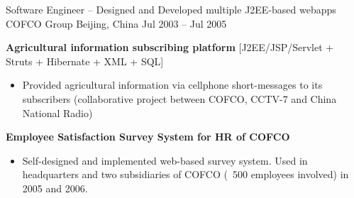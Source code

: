 \begin{cventries}
\cventry
{Software Engineer \tiny{-- Designed and Developed multiple J2EE-based webapps}}                   %
{COFCO Group}                         %
{Beijing, China}                      %
{Jul 2003 -- Jul 2005}                %
{
    \begin{cvitems}                          
    \item {
        \textbf{Agricultural information subscribing platform} 
        {\small{[J2EE/JSP/Servlet + Struts + Hibernate + XML + SQL]}}
        \begin{itemize}
            \item  Provided agricultural information via cellphone short-messages to its subscribers (collaborative project between COFCO, CCTV-7 and China National Radio)
        \end{itemize} 
	}          
    \item {
        \textbf{Employee Satisfaction Survey System for HR of COFCO}
        \begin{itemize}
            \item  Self-designed and implemented web-based survey system. Used in headquarters and two subsidiaries of COFCO (~500 employees involved) in 2005 and 2006.
        \end{itemize} 
	}        
    \end{cvitems}  %
}
\end{cventries}
